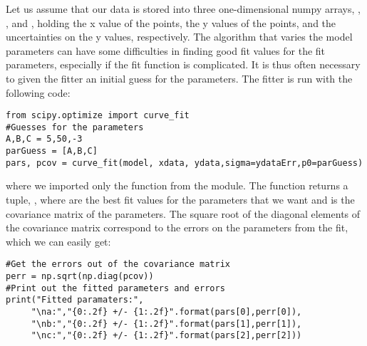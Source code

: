 Let us assume that our data is stored into three one-dimensional numpy arrays, , , and , holding the x value of the points, the y values of the points, and the uncertainties on the y values, respectively. The algorithm that varies the model parameters can have some difficulties in finding good fit values for the fit parameters, especially if the fit function is complicated. It is thus often necessary to given the fitter an initial guess for the parameters. The fitter is run with the following code:

\begin{lstlisting}[frame=single] 
from scipy.optimize import curve_fit
#Guesses for the parameters
A,B,C = 5,50,-3
parGuess = [A,B,C]
pars, pcov = curve_fit(model, xdata, ydata,sigma=ydataErr,p0=parGuess)
\end{lstlisting}
where we imported only the  function from the  module. The  function returns a tuple, , where  are the best fit values for the parameters that we want and  is the covariance matrix of the parameters. The square root of the diagonal elements of the covariance matrix correspond to the errors on the parameters from the fit, which we can easily get:
\begin{lstlisting}[frame=single] 
#Get the errors out of the covariance matrix
perr = np.sqrt(np.diag(pcov))
#Print out the fitted parameters and errors
print("Fitted paramaters:",
     "\na:","{0:.2f} +/- {1:.2f}".format(pars[0],perr[0]),
     "\nb:","{0:.2f} +/- {1:.2f}".format(pars[1],perr[1]),
     "\nc:","{0:.2f} +/- {1:.2f}".format(pars[2],perr[2]))
\end{lstlisting}

